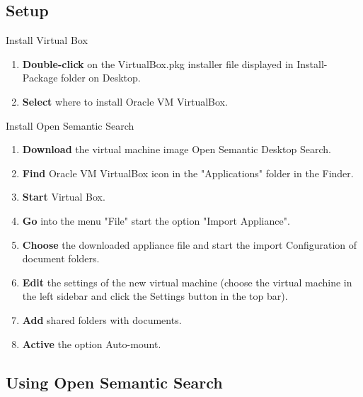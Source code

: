 \documentclass[10pt,a4paper]{article}
\begin{document}
\subsection{Setup}


\begin{textbox}{Install Virtual Box}
 

  


\begin{enumerate}
\item \textbf {Double-click} on the VirtualBox.pkg installer file displayed in Install-Package folder on Desktop.
\item \textbf {Select} where to install Oracle VM VirtualBox.

\end{enumerate}


\end{textbox}

\begin{textbox}{Install Open Semantic Search}
 

  

\begin{enumerate}
\item \textbf{Download} the virtual machine image Open Semantic Desktop Search. 
\item \textbf {Find} Oracle VM VirtualBox icon in the "Applications" folder in the Finder.
\item \textbf{Start} Virtual Box.
\item \textbf{Go} into the menu "File" start the option "Import Appliance".
\item \textbf{Choose} the downloaded appliance file and start the import Configuration of document folders.
\item \textbf{Edit} the settings of the new virtual machine (choose the virtual machine in the left sidebar and click the Settings button in the top bar).
\item \textbf{Add} shared folders with documents.
\item \textbf{Active} the option Auto-mount.
\end{enumerate}

\end{textbox}

\subsection{Using Open Semantic Search}
\end{document}
